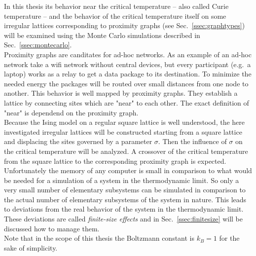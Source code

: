 In this thesis its behavior near the critical temperature -- also called
Curie temperature -- and the behavior of the critical temperature itself
on some irregular lattices corresponding to proximity graphs
(see Sec.\ \ref{ssec:graphtypes}) will be examined using the Monte
Carlo simulations described in Sec.\ \ref{ssec:montecarlo}.\\
Proximity graphs are canditates for ad-hoc networks. As an example of an
ad-hoc network take a wifi network without central devices, but every
participant (e.g.\ a laptop) works as a relay to get a data package to its
destination. To minimize the needed energy the packages will be routed
over small distances from one node to another. This behavior is well mapped
by proximity graphs. They establish a lattice by connecting sites which
are "near" to each other. The exact definition of "near" is dependend on
the proximity graph.\\
Because the Ising model on a regular square lattice is well understood,
the here investigated irregular lattices will be constructed starting from
a square lattice and displacing the sites governed by a parameter \(\sigma\).
Then the influence of \(\sigma\) on the critical temperature will be
analyzed. A crossover of the critical temperature from the square lattice
to the corresponding proximity graph is expected.\\

Unfortunately the memory of any computer is small in comparison to what
would be needed for a simulation of a system in the
thermodynamic limit. So only a very small number of elementary subsystems can be
simulated in comparison to the actual number of elementary subsystems
of the system in nature. This leads to deviations from the real behavior
of the system in the thermodynamic limit. These deviations are called
\emph{finite-size effects} and in Sec.\ \ref{ssec:finitesize} will be
discussed how to manage them.\\

Note that in the scope of this thesis the Boltzmann constant is \(k_{B}=1\)
for the sake of simplicity.
